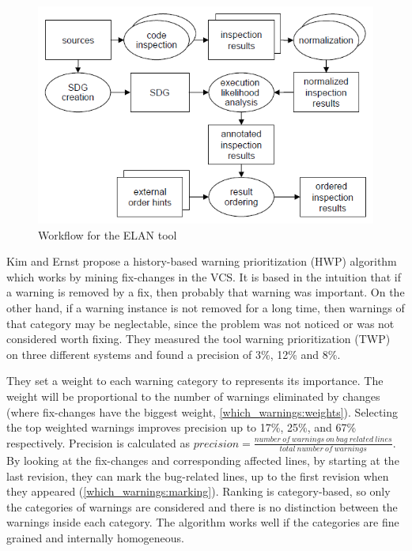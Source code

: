 \documentclass{article}
\begin{document}
 \begin{figure}[H]
     \centering
     \includegraphics[scale=0.4]{./src/elan_workflow.png}
     \caption{Workflow for the ELAN tool}\label{elan:workflow}
 \end{figure}


 Kim and Ernst \cite{which_warnings} propose a history-based warning prioritization (HWP) algorithm which works by mining fix-changes in the VCS. It is based in the intuition that if a warning is removed by a fix, then probably that warning was important. On the other hand, if a warning instance is not removed for a long time, then warnings of
 that category may be neglectable, since the problem was not noticed or was not considered worth fixing. They measured the tool warning prioritization (TWP) on three different systems and found a precision of 3\%, 12\% and 8\%.  

 They set a weight to each warning category to represents its importance. The weight will be proportional to the number of warnings eliminated by changes (where fix-changes have the biggest weight, \cref{which_warnings:weights}). Selecting the top weighted warnings improves precision up to 17\%, 25\%, and 67\% respectively. Precision is calculated as $precision = \frac{number\:of \:warnings\:on\:bug\:related\:lines}{total\:number\:of\:warnings}$.
 By looking at the fix-changes and corresponding affected lines, by starting at the last revision, they can mark the bug-related lines, up to the first revision when they appeared (\cref{which_warnings:marking}). Ranking is category-based, so only the categories of warnings are considered and there is no distinction between the warnings inside each category. The algorithm works well if the categories are fine grained and internally homogeneous.
\end{document}

